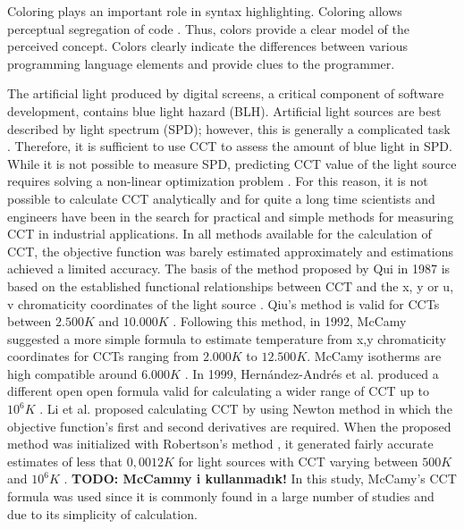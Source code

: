 \documentclass{article}
\begin{document}
Coloring plays an important role in syntax highlighting. Coloring allows perceptual segregation of code \cite{hannebauer2018does}. Thus, colors provide a clear model of the perceived concept. Colors clearly indicate the differences between various programming language elements and provide clues to the programmer.

The artificial light produced by digital screens, a critical component of software development, contains blue light hazard (BLH). Artificial light sources are best described by light spectrum (SPD); however, this is generally a complicated task \cite{abe1991}. Therefore, it is sufficient to use CCT to assess the amount of blue light in SPD. While it is not possible to measure SPD, predicting CCT value of the light source requires solving a non-linear optimization problem \cite{li2016}. For this reason, it is not possible to calculate CCT analytically and for quite a long time scientists and engineers have been in the search for practical and simple methods for measuring CCT in industrial applications. In all methods available for the calculation of CCT, the objective function was barely estimated approximately and estimations achieved a limited accuracy. The basis of the method proposed by Qui in 1987 is based on the established functional relationships between CCT and the x, y or u, v chromaticity coordinates of the light source \cite{xingzhong1987formulas}. Qiu’s method is valid for CCTs between $2.500 K$ and $10.000 K$ \cite{li2016}. Following this method, in 1992, McCamy \cite{mccamy1992correlated,mccamy1993correlated} suggested  a more simple formula to estimate temperature from x,y chromaticity coordinates for CCTs ranging from $2.000 K$ to $12.500 K$. McCamy isotherms are high compatible around $6.000 K$ \cite{davis2020correlated}. In 1999, Hernández-Andrés et al.\cite{hernandez1999calculating} produced a different open open formula valid for calculating a wider range of CCT up to $10^6 K$ \cite{li2016}. Li et al. proposed calculating CCT by using Newton method in which the objective function’s first and second derivatives are required. When the proposed method was initialized with Robertson’s method \cite{robertson1968computation}, it generated fairly accurate estimates of less that $0,0012 K$ for light sources with CCT varying between $500 K$ and $10^6 K$ \cite{li2016}. \textbf{TODO: McCammy i kullanmadık!} In this study, McCamy’s CCT formula was used since it is commonly found in a large number of studies and due to its simplicity of calculation.
\end{document}
